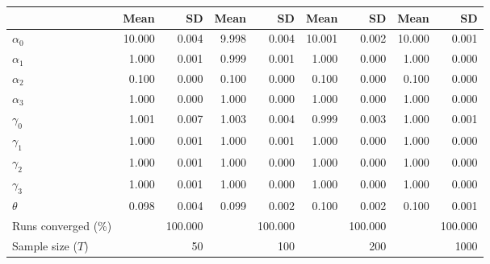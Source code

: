 
\begin{tabular}[t]{lrrrrrrrr}
\toprule
  & Mean & SD & Mean  & SD  & Mean   & SD   & Mean    & SD   \\
\midrule
$\alpha_{0}$ & 10.000 & 0.004 & 9.998 & 0.004 & 10.001 & 0.002 & 10.000 & 0.001\\
$\alpha_{1}$ & 1.000 & 0.001 & 0.999 & 0.001 & 1.000 & 0.000 & 1.000 & 0.000\\
$\alpha_{2}$ & 0.100 & 0.000 & 0.100 & 0.000 & 0.100 & 0.000 & 0.100 & 0.000\\
$\alpha_{3}$ & 1.000 & 0.000 & 1.000 & 0.000 & 1.000 & 0.000 & 1.000 & 0.000\\
$\gamma_{0}$ & 1.001 & 0.007 & 1.003 & 0.004 & 0.999 & 0.003 & 1.000 & 0.001\\
$\gamma_{1}$ & 1.000 & 0.001 & 1.000 & 0.001 & 1.000 & 0.000 & 1.000 & 0.000\\
$\gamma_{2}$ & 1.000 & 0.001 & 1.000 & 0.000 & 1.000 & 0.000 & 1.000 & 0.000\\
$\gamma_{3}$ & 1.000 & 0.001 & 1.000 & 0.000 & 1.000 & 0.000 & 1.000 & 0.000\\
$\theta$ & 0.098 & 0.004 & 0.099 & 0.002 & 0.100 & 0.002 & 0.100 & 0.001\\
Runs converged (\%) &  & 100.000 &  & 100.000 &  & 100.000 &  & 100.000\\
Sample size ($T$) &  & 50 &  & 100 &  & 200 &  & 1000\\
\bottomrule
\end{tabular}
